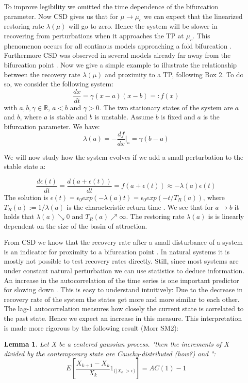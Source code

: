 \documentclass[%
thesis=student,%
coverpage=false,%
titlepage=false,%
headmarks=true, %
german,%
font=libertine, %
math=newpxtx, %
BCOR=5mm,%
coverBCOR=11mm%
]{tumbook}
\newtheorem{lemma}{Lemma}
\begin{document}
To improve legibility we omitted the time dependence of the bifurcation parameter. Now CSD gives us that for $\mu \rightarrow \mu_{c}$ we can expect that the linearized restoring rate $\lambda(\mu)$ will go to zero. Hence the system will be slower in recovering from perturbations when it approaches the TP at $\mu_{c}$. This phenomenon occurs for all continous models approaching a fold bifurcation \cite{Wissel:1984}. Furthermore CSD was observed in several models already far away from the bifurcation point \cite{VanNes:2007}. Now we give a simple example to illustrate the relationship between the recovery rate $\lambda(\mu)$ and proximity to a TP, following \cite{Scheffer:2009} Box 2. To do so, we consider the following system: 
\begin{equation}
    \frac{dx}{dt} = \gamma (x-a)(x-b) =: f(x) \label{eq:1}
\end{equation}
with $a,b,\gamma \in \mathbb{R}$, $a < b$ and $\gamma > 0$. The two stationary states of the system are $a$ and $b$, where $a$ is stable and $b$ is unstable. Assume $b$ is fixed and $a$ is the bifurcation parameter.
We have: 
\[\lambda (a) = -\frac{df}{dx}|_{a} = \gamma(b-a)\] 

We will now study how the system evolves if we add a small perturbation to the stable state a:

\[
\frac{d\epsilon(t)}{dt} = \frac{d(a + \epsilon(t))}{dt} = f(a + \epsilon(t)) \approx 
 -\lambda(a)\epsilon(t)
\]
The solution is $\epsilon(t) = \epsilon_{0}exp(-\lambda(a)t) = \epsilon_{0}exp(-t/T_{R}(a))$, where $T_{R}(a) := 1/ \lambda(a)$ is the characteristic return time \cite{Wissel:1984}.
We see that for $a \rightarrow b$ it holds that $\lambda(a) \searrow 0$ and $T_{R}(a)\nearrow \infty$. The restoring rate $\lambda(a)$ is is linearly dependent on the size of the basin of attraction.

From CSD we know that the recovery rate after a small disturbance of a system is an indicator for proximity to a bifurcation point \cite{VanNes:2007}. In natural systems it is mostly not possible to test recovery rates directly. Still, since most systems are under constant natural perturbation we can use statistics to deduce information. An increase in the autocorrelation of the time series is one important predictor for slowing down \cite{Ives:1995}. This is easy to understand intuitively: Due to the decrease in recovery rate of the system the states get more and more similar to each other. The lag-1 autocorrelation measures how closely the current state is correlated to the past state. Hence we expect an increase in this measure. This interpretation is made more rigorous by the following result (Morr SM2): 
\begin{lemma}
    Let X be a centered gaussian process. "then the increments of X divided by the contemporary state are Cauchy-distributed (how?) and ":
    \[
    E[\frac{X_{k+1}-X_{k}}{X_{k}}1_{\{\lvert X_{k} \rvert > \epsilon\}}] = AC(1) - 1
    \]
\end{lemma}
\end{document}
